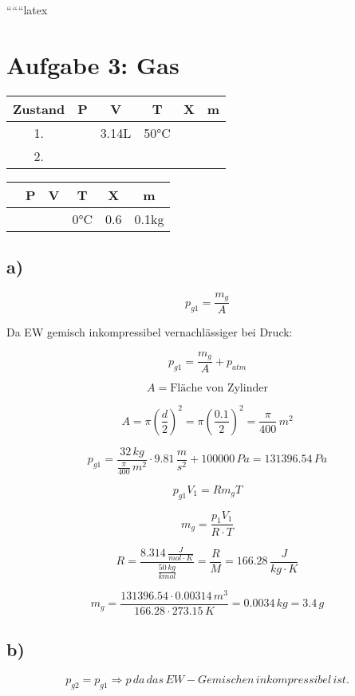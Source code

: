 
``````latex


\section*{Aufgabe 3: Gas}

\begin{tabular}{|c|c|c|c|c|c|}
\hline
Zustand & P & V & T & X & m \\
\hline
1. & & 3.14L & 50°C & & \\
\hline
2. & & & & & \\
\hline
\end{tabular}

\begin{tabular}{|c|c|c|c|c|c|}
\hline
 & P & V & T & X & m \\
\hline
 & & & 0°C & 0.6 & 0.1kg \\
\hline
\end{tabular}

\subsection*{a)}

\[
p_{g1} = \frac{m_g}{A}
\]

Da EW gemisch inkompressibel vernachlässiger bei Druck:

\[
p_{g1} = \frac{m_g}{A} + p_{atm}
\]

\[
A = \text{Fläche von Zylinder}
\]

\[
A = \pi \left( \frac{d}{2} \right)^2 = \pi \left( \frac{0.1}{2} \right)^2 = \frac{\pi}{400} \, m^2
\]

\[
p_{g1} = \frac{32 \, kg}{\frac{\pi}{400} \, m^2} \cdot 9.81 \, \frac{m}{s^2} + 100000 \, Pa = 131396.54 \, Pa
\]

\[
p_{g1} V_1 = R m_g T
\]

\[
m_g = \frac{p_1 V_1}{R \cdot T}
\]

\[
R = \frac{8.314 \, \frac{J}{mol \cdot K}}{\frac{50 \, kg}{kmol}} = \frac{R}{M} = 166.28 \, \frac{J}{kg \cdot K}
\]

\[
m_g = \frac{131396.54 \cdot 0.00314 \, m^3}{166.28 \cdot 273.15 \, K} = 0.0034 \, kg = 3.4 \, g
\]

\subsection*{b)}

\[
p_{g2} = p_{g1} \Rightarrow p \, da \, das \, EW-Gemischen \, inkompressibel \, ist.
\]

